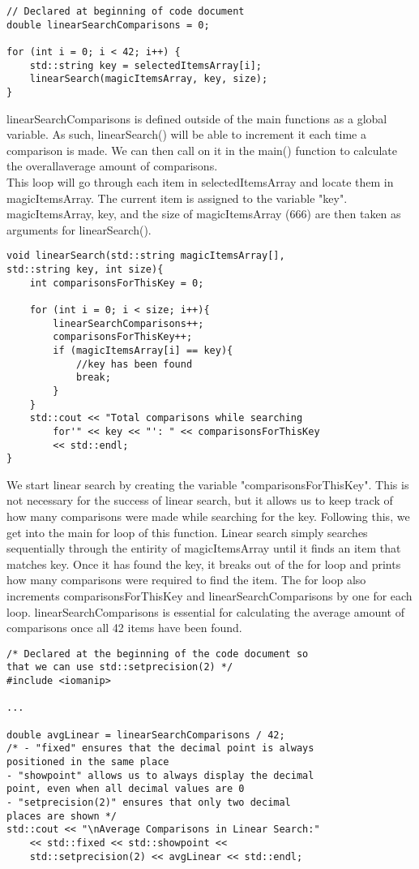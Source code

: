 \documentclass{article}
\begin{document}
\begin{lstlisting}
// Declared at beginning of code document
double linearSearchComparisons = 0;

for (int i = 0; i < 42; i++) {
    std::string key = selectedItemsArray[i];
    linearSearch(magicItemsArray, key, size);
}
\end{lstlisting}

linearSearchComparisons is defined outside of the main functions as a global variable. As such, linearSearch() will be able to increment it each time a comparison is made. We can then call on it in the main() function to calculate the overallaverage amount of comparisons. \\ This loop will go through each item in selectedItemsArray and locate them in magicItemsArray. The current item is assigned to the variable "key". magicItemsArray, key, and the size of magicItemsArray (666) are then taken as arguments for linearSearch().

\begin{lstlisting}
void linearSearch(std::string magicItemsArray[], 
std::string key, int size){
    int comparisonsForThisKey = 0;

    for (int i = 0; i < size; i++){
        linearSearchComparisons++;
        comparisonsForThisKey++;
        if (magicItemsArray[i] == key){
            //key has been found
            break;
        }
    }
    std::cout << "Total comparisons while searching 
        for'" << key << "': " << comparisonsForThisKey 
        << std::endl;
}
\end{lstlisting}

We start linear search by creating the variable "comparisonsForThisKey". This is not necessary for the success of linear search, but it allows us to keep track of how many comparisons were made while searching for the key. Following this, we get into the main for loop of this function. Linear search simply searches sequentially through the entirity of magicItemsArray until it finds an item that matches key. Once it has found the key, it breaks out of the for loop and prints how many comparisons were required to find the item. The for loop also increments comparisonsForThisKey and linearSearchComparisons by one for each loop. linearSearchComparisons is essential for calculating the average amount of comparisons once all 42 items have been found.

\begin{lstlisting}
/* Declared at the beginning of the code document so 
that we can use std::setprecision(2) */
#include <iomanip>

...

double avgLinear = linearSearchComparisons / 42;
/* - "fixed" ensures that the decimal point is always 
positioned in the same place
- "showpoint" allows us to always display the decimal 
point, even when all decimal values are 0
- "setprecision(2)" ensures that only two decimal 
places are shown */
std::cout << "\nAverage Comparisons in Linear Search:" 
    << std::fixed << std::showpoint << 
    std::setprecision(2) << avgLinear << std::endl;
\end{lstlisting}
\end{document}

